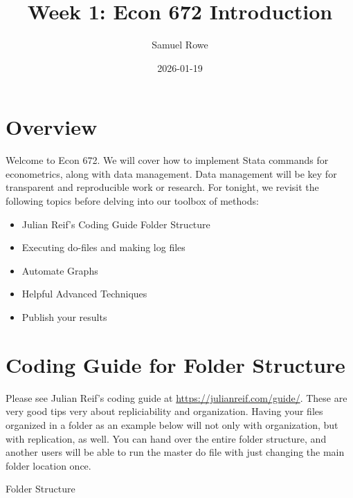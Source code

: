 \documentclass[
]{book}
\title{Week 1: Econ 672 Introduction}
\author{Samuel Rowe}
\date{2026-01-19}
\providecommand{\tightlist}{%
  \setlength{\itemsep}{0pt}\setlength{\parskip}{0pt}}
\begin{document}
\maketitle

{
\setcounter{tocdepth}{1}
\tableofcontents
}
\chapter*{Overview}\label{overview}

Welcome to Econ 672. We will cover how to implement Stata commands for econometrics, along with data management. Data management will be key for transparent and reproducible work or research. For tonight, we revisit the following topics before delving into our toolbox of methods:

\begin{itemize}
\tightlist
\item
  Julian Reif's Coding Guide Folder Structure
\item
  Executing do-files and making log files
\item
  Automate Graphs
\item
  Helpful Advanced Techniques
\item
  Publish your results
\end{itemize}

\chapter{Coding Guide for Folder Structure}\label{coding-guide-for-folder-structure}

Please see Julian Reif's coding guide at \url{https://julianreif.com/guide/}. These are very good tips very about repliciability and organization. Having your files organized in a folder as an example below will not only with organization, but with replication, as well. You can hand over the entire folder structure, and another users will be able to run the master do file with just changing the main folder location once.

Folder Structure
\end{document}
